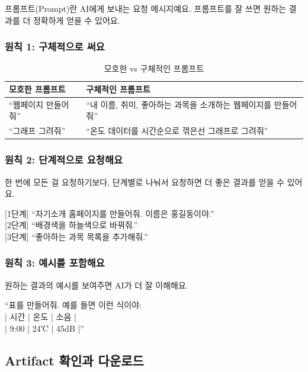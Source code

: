 \documentclass[11pt, a4paper]{article}
\begin{document}
프롬프트(Prompt)란 AI에게 보내는 요청 메시지예요. 프롬프트를 잘 쓰면 원하는 결과를 더 정확하게 얻을 수 있어요.

\subsubsection{원칙 1: 구체적으로 써요}

\begin{table}[H]\centering
\caption{모호한 vs 구체적인 프롬프트}
\begin{tabular}{p{4.5cm}p{8cm}}\toprule
\textbf{모호한 프롬프트} & \textbf{구체적인 프롬프트} \\\midrule
``웹페이지 만들어줘'' & ``내 이름, 취미, 좋아하는 과목을 소개하는 웹페이지를 만들어줘'' \\
``그래프 그려줘'' & ``온도 데이터를 시간순으로 꺾은선 그래프로 그려줘'' \\
\bottomrule
\end{tabular}
\end{table}

\subsubsection{원칙 2: 단계적으로 요청해요}

한 번에 모든 걸 요청하기보다, 단계별로 나눠서 요청하면 더 좋은 결과를 얻을 수 있어요.

\begin{promptbox}
{[1단계]} ``자기소개 홈페이지를 만들어줘. 이름은 홍길동이야.''\\
{[2단계]} ``배경색을 하늘색으로 바꿔줘.''\\
{[3단계]} ``좋아하는 과목 목록을 추가해줘.''
\end{promptbox}

\subsubsection{원칙 3: 예시를 포함해요}

원하는 결과의 예시를 보여주면 AI가 더 잘 이해해요.

\begin{promptbox}
``표를 만들어줘. 예를 들면 이런 식이야:\\
| 시간 | 온도 | 소음 |\\
| 9:00 | 24℃ | 45dB |''
\end{promptbox}

\subsection{Artifact 확인과 다운로드}
\end{document}
